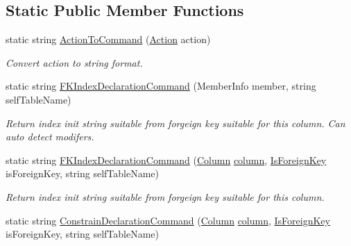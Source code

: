 \subsection*{Static Public Member Functions}
\begin{DoxyCompactItemize}
\item 
static string \mbox{\hyperlink{class_uniform_data_operator_1_1_sql_1_1_attributes_1_1_is_foreign_key_a2673778ee437ef079b99d58636f7617b}{Action\+To\+Command}} (\mbox{\hyperlink{class_uniform_data_operator_1_1_sql_1_1_attributes_1_1_is_foreign_key_a6039622384e2bbd1aa386e326ee0f850}{Action}} action)
\begin{DoxyCompactList}\small\item\em Convert action to string format. \end{DoxyCompactList}\item 
static string \mbox{\hyperlink{class_uniform_data_operator_1_1_sql_1_1_attributes_1_1_is_foreign_key_a8d5c79de848dd87916ab946972db0188}{F\+K\+Index\+Declaration\+Command}} (Member\+Info member, string self\+Table\+Name)
\begin{DoxyCompactList}\small\item\em Return index init string suitable from forgeign key suitable for this column. Can auto detect modifers. \end{DoxyCompactList}\item 
static string \mbox{\hyperlink{class_uniform_data_operator_1_1_sql_1_1_attributes_1_1_is_foreign_key_a6becd6dc4bd6df070252b152a57f0152}{F\+K\+Index\+Declaration\+Command}} (\mbox{\hyperlink{class_uniform_data_operator_1_1_sql_1_1_attributes_1_1_column}{Column}} \mbox{\hyperlink{class_uniform_data_operator_1_1_sql_1_1_attributes_1_1_is_foreign_key_a8d14eef86991a9e1a187876626cbb70b}{column}}, \mbox{\hyperlink{class_uniform_data_operator_1_1_sql_1_1_attributes_1_1_is_foreign_key}{Is\+Foreign\+Key}} is\+Foreign\+Key, string self\+Table\+Name)
\begin{DoxyCompactList}\small\item\em Return index init string suitable from forgeign key suitable for this column. \end{DoxyCompactList}\item 
static string \mbox{\hyperlink{class_uniform_data_operator_1_1_sql_1_1_attributes_1_1_is_foreign_key_a795f460cb328bfe6d471134b4d48bedf}{Constrain\+Declaration\+Command}} (\mbox{\hyperlink{class_uniform_data_operator_1_1_sql_1_1_attributes_1_1_column}{Column}} \mbox{\hyperlink{class_uniform_data_operator_1_1_sql_1_1_attributes_1_1_is_foreign_key_a8d14eef86991a9e1a187876626cbb70b}{column}}, \mbox{\hyperlink{class_uniform_data_operator_1_1_sql_1_1_attributes_1_1_is_foreign_key}{Is\+Foreign\+Key}} is\+Foreign\+Key, string self\+Table\+Name)

\end{DoxyCompactItemize}
